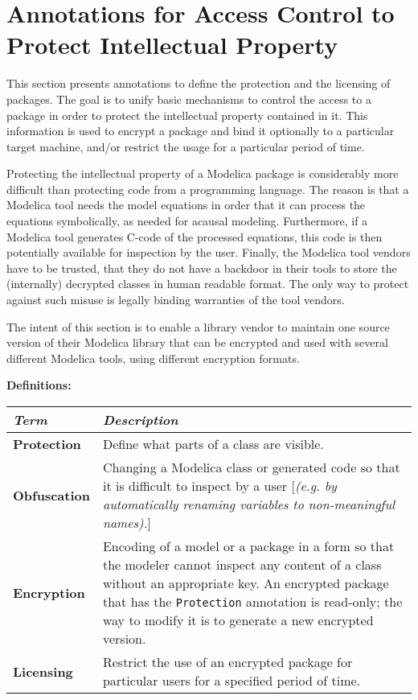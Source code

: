 \section{Annotations for Access Control to Protect Intellectual Property}

This section presents annotations to define the protection and the
licensing of packages. The goal is to unify basic mechanisms to control
the access to a package in order to protect the intellectual property
contained in it. This information is used to encrypt a package and bind
it optionally to a particular target machine, and/or restrict the usage
for a particular period of time.

\begin{nonnormative}
Protecting the intellectual property of a Modelica package is
considerably more difficult than protecting code from a programming
language. The reason is that a Modelica tool needs the model equations
in order that it can process the equations symbolically, as needed for
acausal modeling. Furthermore, if a Modelica tool generates C-code of
the processed equations, this code is then potentially available for
inspection by the user. Finally, the Modelica tool vendors have to be
trusted, that they do not have a backdoor in their tools to store the
(internally) decrypted classes in human readable format. The only way to
protect against such misuse is legally binding warranties of the tool
vendors.

The intent of this section is to enable a library vendor to
maintain one source version of their Modelica library that can be
encrypted and used with several different Modelica tools, using
different encryption formats.
\end{nonnormative}

\textbf{Definitions:}

\begin{longtable}[]{|p{2.5cm}|p{12cm}|}
\hline
\emph{Term} & \emph{Description}\\ \hline
\endhead
\textbf{Protection} & Define what parts of a class are
visible.\\ \hline
\textbf{Obfuscation} & Changing a Modelica class or generated code so
that it is difficult to inspect by a user {[}\emph{(e.g. by
automatically renaming variables to non-meaningful
names).}{]}\\ \hline
\textbf{Encryption} & Encoding of a model or a package in a form so that
the modeler cannot inspect any content of a class without an appropriate
key. An encrypted package that has the \lstinline!Protection! annotation is
read-only; the way to modify it is to generate a new encrypted
version.\\ \hline
\textbf{Licensing} & Restrict the use of an encrypted package for
particular users for a specified period of time.\\ \hline

\end{longtable}

